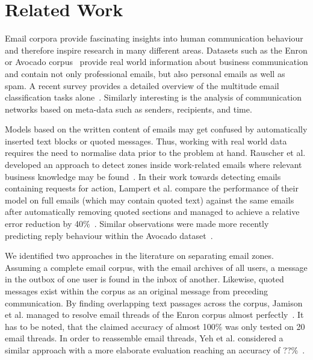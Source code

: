 \documentclass{llncs}
\begin{document}
\section{Related Work}

Email corpora provide fascinating insights into human communication behaviour and therefore inspire research in many different areas.
Datasets such as the Enron or Avocado corpus~\cite{avocado,enron} provide real world information about business communication and contain not only professional emails, but also personal emails as well as spam.
A recent survey provides a detailed overview of the multitude email classification tasks alone~\cite{classification}.
Similarly interesting is the analysis of communication networks based on meta-data such as senders, recipients, and time.

Models based on the written content of emails may get confused by automatically inserted text blocks or quoted messages.
Thus, working with real world data requires the need to normalise data prior to the problem at hand.
Rauscher et al. developed an approach to detect zones inside work-related emails where relevant business knowledge may be found~\cite{rauscher2015context}.
In their work towards detecting emails containing requests for action, Lampert et al. compare the performance of their model on full emails (which may contain quoted text) against the same emails after automatically removing quoted sections and managed to achieve a relative error reduction by 40\%~\cite{rfa}.
Similar observations were made more recently predicting reply behaviour within the Avocado dataset~\cite{replying}.

We identified two approaches in the literature on separating email zones.
Assuming a complete email corpus, with the email archives of all users, a message in the outbox of one user is found in the inbox of another.
Likewise, quoted messages exist within the corpus as an original message from preceding communication.
By finding overlapping text passages across the corpus, Jamison et al. managed to resolve email threads of the Enron corpus almost perfectly~\cite{headerless}.
It has to be noted, that the claimed accuracy of almost 100\% was only tested on 20 email threads.
In order to reassemble email threads, Yeh et al. considered a similar approach with a more elaborate evaluation reaching an accuracy of ??\%~\cite{similarity}.
\end{document}
